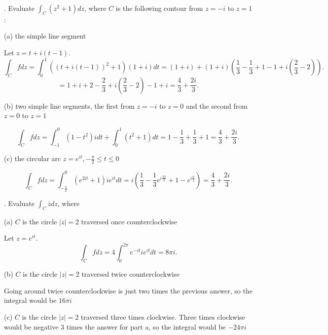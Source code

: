 \documentclass[letterpaper, reqno,11pt]{article}
\begin{document}
. Evaluate $ \int_{C} (z^2 +1) dz$, where $C$ is the following contour from $z=-i$ to $z=1$:

(a) the simple line segment

Let $z=t+i(t-1)$. 
\[
\int_C fdz=\int_0^1 \left( \left( t+i(t-1) \right) ^2+1 \right) \left( 1+i \right) dt=(1+i)+\left( 1+i \right) \left( \frac{1}{3}-\frac{1}{3}+1-1+i\left( \frac{2}{3}-2 \right)  \right) 
.\]
\[
=1+i+2-\frac{2}{3}+i\left( \frac{2}{3}-2 \right) -1+i=\frac{4}{3}+\frac{2i}{3}
.\]

(b) two simple line segments, the first from $z=-i$ to $z=0$ and the second from $z=0$ to $z=1$

\[
\int_C fdz=\int_{-1}^{0}\left( 1-t^2 \right)idt+\int_0^{1}\left( t^2+1 \right)dt=1-\frac{1}{3}+\frac{1}{3}+1=\frac{4}{3}+\frac{2i}{3}  
.\]

(c) the circular arc $ z= e^{it}, -\frac{\pi}{2} \leq t \leq 0 $

 \[
\int_C fdz=\int_{-\frac{\pi}{2}}^{0}\left( e^{2it}+1 \right)ie^{it}dt=i\left( \frac{1}{3}-\frac{1}{3}e^{i \frac{3\pi}{2}}+1-e^{i\frac{\pi}{2}} \right)=\frac{4}{3}+\frac{2i}{3}
.\]


\medskip

. Evaluate  $ \int_{C} \bar{z} dz $, where

(a) $C$ is the circle   $ |z|=2$ traversed once counterclockwise

Let $z=e^{it}$. 
\[
\int_C fdz=4\int_0^{2\pi}e^{-it}ie^{it}dt=8\pi i
.\]

(b) $C$ is the circle   $ |z|=2$ traversed twice counterclockwise

Going around twice counterclockwise is just two times the previous answer, so the integral would be $16\pi i$

(c) $C$ is the circle   $ |z|=2$ traversed three times clockwise.
Three times clockwise would be negative 3 times the answer for part a, so the integral would be $-24\pi i$
\end{document}
